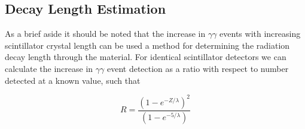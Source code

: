 \subsection{Decay Length Estimation}
As a brief aside it should be noted that the increase in $\gamma\gamma$ events with increasing scintillator crystal length can be used a method for determining the radiation decay length through the material. For identical scintillator detectors we can calculate the increase in $\gamma\gamma$ event detection as a ratio with respect to number detected at a known value, such that

\begin{equation}
R = \frac{(1-e^{-Z/\lambda})^2}{(1-e^{-5/\lambda})}
\end{equation}